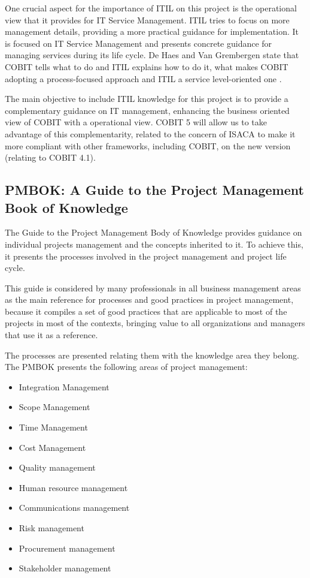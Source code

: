 One crucial aspect for the importance of ITIL on this project is the operational view that it provides for IT Service Management. ITIL tries to focus on more management details, providing a more practical guidance for implementation. It is focused on IT Service Management and presents concrete guidance for managing services during its life cycle. De Haes and Van Grembergen state that COBIT tells what to do and ITIL explains how to do it, what makes COBIT adopting a process-focused approach and ITIL a service level-oriented one \cite{ITGovAndMech}.\par
The main objective to include ITIL knowledge for this project is to provide a complementary guidance on IT management, enhancing the business oriented view of COBIT with a operational view. COBIT 5 will allow us to take advantage of this complementarity, related to the concern of ISACA to make it more compliant with other frameworks, including COBIT, on the new version (relating to COBIT 4.1). 

\subsection{PMBOK: A Guide to the Project Management Book of Knowledge}

The Guide to the Project Management Body of Knowledge provides guidance on individual projects management and the concepts inherited to it. To achieve this, it presents the processes involved in the project management and project life cycle.\cite{pmbok5}\par
This guide is considered by many professionals in all business management areas as the main reference for processes and good practices in project management, because it compiles a set of good practices that are applicable to most of the projects in most of the contexts, bringing value to all organizations and managers that use it as a reference.\par 
The processes are presented relating them with the knowledge area they belong. The PMBOK presents the following areas of project management:

\begin{itemize}
  \item Integration Management
  \item Scope Management
  \item Time Management
  \item Cost Management
  \item Quality management
  \item Human resource management
  \item Communications management
  \item Risk management
  \item Procurement management
  \item Stakeholder management
\end{itemize} 

